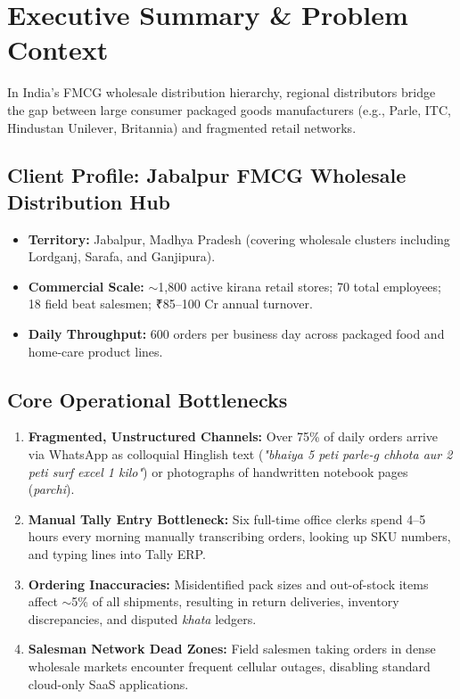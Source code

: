 \documentclass[11pt,a4paper]{article}
\begin{document}
\tableofcontents
\newpage

\section{Executive Summary \& Problem Context}

In India's FMCG wholesale distribution hierarchy, regional distributors bridge the gap between large consumer packaged goods manufacturers (e.g., Parle, ITC, Hindustan Unilever, Britannia) and fragmented retail networks. 

\subsection{Client Profile: Jabalpur FMCG Wholesale Distribution Hub}
\begin{itemize}[leftmargin=1.5cm]
    \item \textbf{Territory:} Jabalpur, Madhya Pradesh (covering wholesale clusters including Lordganj, Sarafa, and Ganjipura).
    \item \textbf{Commercial Scale:} $\sim$1,800 active kirana retail stores; 70 total employees; 18 field beat salesmen; ₹85--100 Cr annual turnover.
    \item \textbf{Daily Throughput:} 600 orders per business day across packaged food and home-care product lines.
\end{itemize}

\subsection{Core Operational Bottlenecks}
\begin{enumerate}[leftmargin=1.5cm]
    \item \textbf{Fragmented, Unstructured Channels:} Over 75\% of daily orders arrive via WhatsApp as colloquial Hinglish text (\textit{"bhaiya 5 peti parle-g chhota aur 2 peti surf excel 1 kilo"}) or photographs of handwritten notebook pages (\textit{parchi}).
    \item \textbf{Manual Tally Entry Bottleneck:} Six full-time office clerks spend 4--5 hours every morning manually transcribing orders, looking up SKU numbers, and typing lines into Tally ERP.
    \item \textbf{Ordering Inaccuracies:} Misidentified pack sizes and out-of-stock items affect $\sim$5\% of all shipments, resulting in return deliveries, inventory discrepancies, and disputed \textit{khata} ledgers.
    \item \textbf{Salesman Network Dead Zones:} Field salesmen taking orders in dense wholesale markets encounter frequent cellular outages, disabling standard cloud-only SaaS applications.
\end{enumerate}
\end{document}
